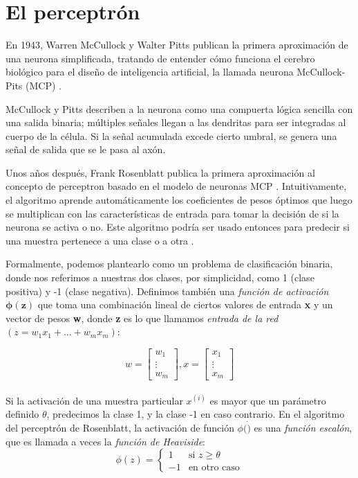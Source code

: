 \section{El perceptrón}
En 1943, Warren McCullock y Walter Pitts publican la primera
aproximación de una neurona simplificada, tratando de entender cómo
funciona el cerebro biológico para el diseño de inteligencia
artificial, la llamada neurona McCullock-Pits (MCP) \cite{mcp}.

McCullock y Pitts describen a la neurona como una compuerta lógica
sencilla con una salida binaria; múltiples señales llegan a las
dendritas para ser integradas al cuerpo de la célula. Si la señal
acumulada excede cierto umbral, se genera una señal de salida que se
le pasa al axón.

Unos años después, Frank Rosenblatt publica la primera aproximación al
concepto de perceptron basado en el modelo de neuronas MCP
\cite{rosenblatt}. Intuitivamente, el algoritmo aprende
automáticamente los coeficientes de pesos óptimos que luego se
multiplican con las características de entrada para tomar la decisión
de si la neurona se activa o no. Este algoritmo podría ser usado
entonces para predecir si una muestra pertenece a una clase o a otra
\cite{python}.

Formalmente, podemos plantearlo como un problema de clasificación
binaria, donde nos referimos a nuestras dos clases, por simplicidad,
como 1 (clase positiva) y -1 (clase negativa). Definimos también una
\textit{función de activación $\mathbf{\phi (z)}$} que toma una
combinación lineal de ciertos valores de entrada \textbf{x} y un
vector de pesos \textbf{w}, donde \textbf{z} es lo que llamamos
\textit{entrada de la red} $(z = w_1x_1 + ... + w_mx_m)$:

\begin{equation*}
w=
    \begin{bmatrix}
        w_1 \\ \vdots \\ w_m
    \end{bmatrix}
    , x=
    \begin{bmatrix}
      x_1 \\ \vdots \\ x_m
    \end{bmatrix}
\end{equation*}
\\ Si la activación de una muestra particular $x^{(i)}$ es mayor que
un parámetro definido $\theta$, predecimos la clase 1, y la clase -1
en caso contrario. En el algoritmo del perceptrón de Rosenblatt, la
activación de función $\phi (\dot)$ es una \textit{función escalón},
que es llamada a veces la \textit{función de Heaviside}:
\begin{equation*}
  \phi(z)= \left\{ \begin{array} {rl} 1 & \text{si } z \geq \theta
    \\ -1 & \text{en otro caso} \end{array} \right.
\end{equation*}

